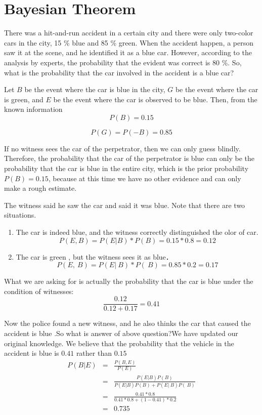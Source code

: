 \section{Bayesian Theorem}\label{}

There was a hit-and-run accident in a certain city and there were only two-color cars in the city, 15 \% blue and 85 \% green. When the accident happen, a person saw it at the scene, and he identified it as a blue car. However, according to the  analysis by experts, the probability that  the evident was correct is 80 \%. So, what is the probability that the car involved in the accident is a blue car?


Let $B$ be the event where the car is blue in the city, $G$ be the event where the car is green, and $E$ be the event where the car is observed to be blue. Then, from the known information
$$P(B)=0.15$$

$$P(G)=P(-B)=0.85$$


If no witness sees the car of the perpetrator, then we can only guess blindly. Therefore, the probability that the car of the perpetrator is blue can only be the probability that the car is blue in the entire city, which is the prior probability $P(B)= 0.15$, because at this time we have no other evidence  and can only make a rough estimate.


The witness said he saw the car and said it was blue. Note that there are two situations.

\begin{enumerate}
  \item
The car is indeed blue, and the witness correctly distinguished the olor of car.
$$P(E,B) = P(E|B) * P(B) = 0.15 * 0.8 = 0.12$$
\item
The car is green , but the witness sees it as blue．
$$P(E,~B) = P(E|~B) * P(~B) = 0.85 * 0.2 = 0.17$$
\end{enumerate}


What we are asking for is actually the probability that the car is blue under the condition of witnesses:
$$
\frac{0.12}{0.12+0.17} = 0.41
$$


Now the police found a new witness, and he also thinks the car that caused the accident is blue
.So what is answer of above question?We have updated our original knowledge. We believe that the probability that the vehicle in the accident is blue is  $0.41$ rather than  $0.15$
\begin{eqnarray*}
P(B|E) &=& 　\frac{P(B,E)}{P(E)} \\
& = &  \frac{P(E|B)P(B)}{P(E|B)P(B)+P(E|~B)P(~B)} \\
& = &  \frac{0.41 * 0.8}{ 0.41 *0.8 + (1-0.41)*0.2} \\
& = &  0.735 \\
\end{eqnarray*}

